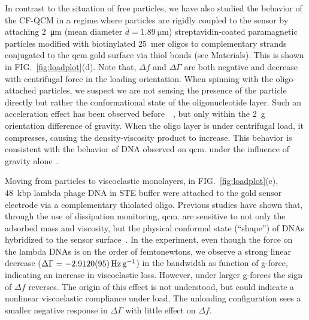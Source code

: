 \documentclass[floatfix,superscriptaddress,a4paper,twocolumn]{revtex4-1}
\newcommand{\Figure}[1]{FIG.~\ref{#1}}
\newcommand{\df}{\Delta\!f}
\newcommand{\dg}{\Delta\Gamma}
\begin{document}
In contrast to the situation of free particles, we have also studied the
behavior of the CF-QCM in a regime where particles are rigidly coupled to
the sensor by attaching \SI{2}{\micro\meter} (mean diameter
$\bar{d}=\SI{1.89}{\micro\meter}$) streptavidin-coated paramagnetic
particles modified with biotinylated \SI{25}{mer} oligos to complementary
strands conjugated to the \gls{qcm} gold surface via thiol bonds (see
Materials).  This is shown in \Figure{fig:loadplot}(d).  Note
that, $\df$ and $\dg$ are both negative and decrease
with centrifugal force in the loading orientation.
When spinning with the oligo-attached
particles, we suspect we are not sensing the presence of the particle
directly but rather the conformational state of the oligonucleotide layer.
Such an acceleration effect has been observed
before~\cite{yoshimoto2002effect}~\cite{fawcett2004evidence}, but only
within the \SI{2}{g} orientation difference of gravity.  When the oligo
layer is under centrifugal load, it compresses, causing the
density-viscosity product to increase.  This behavior is consistent with
the behavior of DNA observed on \gls{qcm}. under the influence of gravity
alone~\cite{fawcett2004evidence}.

Moving from particles to viscoelastic monolayers, in
\Figure{fig:loadplot}(e), \SI{48}{kbp} lambda phage DNA in STE buffer were
attached to the gold sensor electrode via a complementary thiolated oligo.  Previous studies have shown that,
through the use of dissipation monitoring, \gls{qcm}. are sensitive to not only
the adsorbed mass and viscosity, but the physical conformal state
(``shape'') of DNAs hybridized to the sensor
surface~\cite{tsortos2008shear}.  In the experiment, even though the force
on the lambda DNAs is on the order of femtonewtons, we observe a strong
linear decrease ($\dg=\SI{-2.912+-0.0095}{\hertz\per\g}$) in the
bandwidth as function of g-force, indicating an
increase in viscoelastic loss.  However, under larger g-forces the sign of
$\df$ reverses.  The origin of this effect is not understood, but
could indicate a nonlinear viscoelastic compliance under load.  The
unloading configuration sees a smaller negative response in $\dg$ with little
effect on $\df$.
\end{document}
